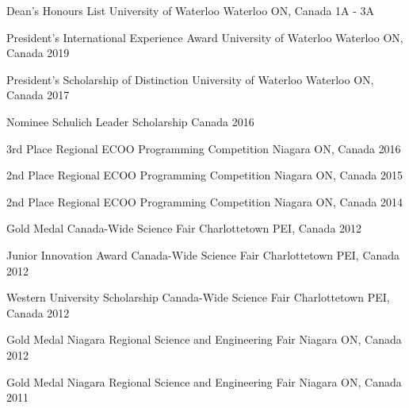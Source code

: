 
\begin{cvhonors}

\cvhonor
    {Dean's Honours List}
    {University of Waterloo}
    {Waterloo ON, Canada}
    {1A - 3A}

\cvhonor
    {President's International Experience Award}
    {University of Waterloo}
    {Waterloo ON, Canada}
    {2019}

\cvhonor
    {President's Scholarship of Distinction}
    {University of Waterloo}
    {Waterloo ON, Canada}
    {2017}

\cvhonor
    {Nominee}
    {Schulich Leader Scholarship}
    {Canada}
    {2016}

\cvhonor
    {3rd Place}
    {Regional ECOO Programming Competition}
    {Niagara ON, Canada}
    {2016}

\cvhonor
    {2nd Place}
    {Regional ECOO Programming Competition}
    {Niagara ON, Canada}
    {2015}

\cvhonor
    {2nd Place}
    {Regional ECOO Programming Competition}
    {Niagara ON, Canada}
    {2014}

\cvhonor
    {Gold Medal}
    {Canada-Wide Science Fair}
    {Charlottetown PEI, Canada}
    {2012}

\cvhonor
    {Junior Innovation Award}
    {Canada-Wide Science Fair}
    {Charlottetown PEI, Canada}
    {2012}

\cvhonor
    {Western University Scholarship}
    {Canada-Wide Science Fair}
    {Charlottetown PEI, Canada}
    {2012}

\cvhonor
    {Gold Medal}
    {Niagara Regional Science and Engineering Fair}
    {Niagara ON, Canada}
    {2012}

\cvhonor
    {Gold Medal}
    {Niagara Regional Science and Engineering Fair}
    {Niagara ON, Canada}
    {2011}

\end{cvhonors}
